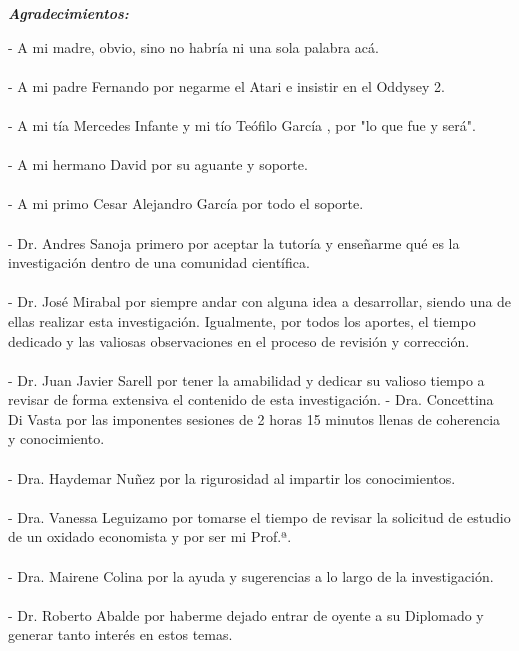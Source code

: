 \documentclass[
  12pt,
  openany]{book}
\begin{document}
\newpage
\begin{center}
\large{\textbf{\emph{\Huge{Agradecimientos:}}}}
\end{center}
\thispagestyle{empty}
\vspace*{2cm}
\thispagestyle{empty}

- A mi madre, obvio, sino no habría ni una sola palabra acá.\\\\
- A mi padre Fernando por negarme el Atari e insistir en el Oddysey 2.\\\\
- A mi tía Mercedes Infante y mi tío Teófilo García \textdagger, por "lo que fue y será".\\\\
- A mi hermano David por su aguante y soporte.\\\\
- A mi primo Cesar Alejandro García por todo el soporte.\\\\
- Dr. Andres Sanoja primero por aceptar la tutoría y enseñarme qué es la investigación dentro de una comunidad científica.\\\\
- Dr. José Mirabal por siempre andar con alguna idea a desarrollar, siendo una de ellas realizar esta investigación. Igualmente, por todos los aportes, el tiempo dedicado y las valiosas observaciones en el proceso de revisión y corrección.\\\\
- Dr. Juan Javier Sarell por tener la amabilidad y dedicar su valioso tiempo a revisar de forma extensiva el contenido de esta investigación.
- Dra. Concettina Di Vasta por las imponentes sesiones de 2 horas 15 minutos llenas de coherencia y conocimiento.\\\\
- Dra. Haydemar Nuñez por la rigurosidad al impartir los conocimientos.\\\\
- Dra. Vanessa Leguizamo por tomarse el tiempo de revisar la solicitud de estudio de un oxidado economista y por ser mi Prof.ª.\\\\
- Dra. Mairene Colina por la ayuda y sugerencias a lo largo de la investigación.\\\\
- Dr. Roberto Abalde por haberme dejado entrar de oyente a su Diplomado y generar tanto interés en estos temas.\\\\
\end{document}
